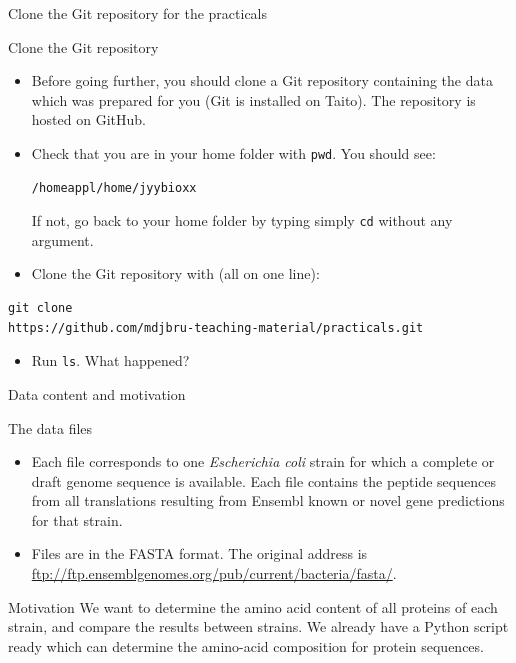 \documentclass[big]{beamer}
\begin{document}
\begin{frame}[fragile,label=sec-2-13]{Clone the Git repository for the practicals}
 \begin{block}{Clone the Git repository}
\begin{itemize}
\item Before going further, you should clone a Git repository containing the data
which was prepared for you (Git is installed on Taito). The repository is
hosted on GitHub.

\item Check that you are in your home folder with \texttt{pwd}. You should see:
\begin{verbatim}
/homeappl/home/jyybioxx
\end{verbatim}
If not, go back to your home folder by typing simply \texttt{cd} without any
argument.

\item Clone the Git repository with (all on one line):
\end{itemize}
\begin{verbatim}
git clone 
https://github.com/mdjbru-teaching-material/practicals.git
\end{verbatim}

\begin{itemize}
\item Run \texttt{ls}. What happened?
\end{itemize}
\end{block}
\end{frame}
\begin{frame}[label=sec-2-14]{Data content and motivation}
\begin{block}{The data files}
\begin{itemize}
\item Each \alert{file} corresponds to \alert{one \emph{Escherichia coli} strain} for which a
complete or draft genome sequence is available. Each file contains the
\alert{peptide sequences} from all translations resulting from Ensembl known or
novel gene predictions for that strain.

\item Files are in the FASTA format. The original address is
  \url{ftp://ftp.ensemblgenomes.org/pub/current/bacteria/fasta/}.
\end{itemize}
\end{block}
\begin{block}{Motivation}
We want to determine the \alert{amino acid content} of \alert{all proteins of each strain},
and compare the results between strains. We already have a Python script ready
which can determine the amino-acid composition for protein sequences.
\end{block}
\end{frame}
\end{document}
